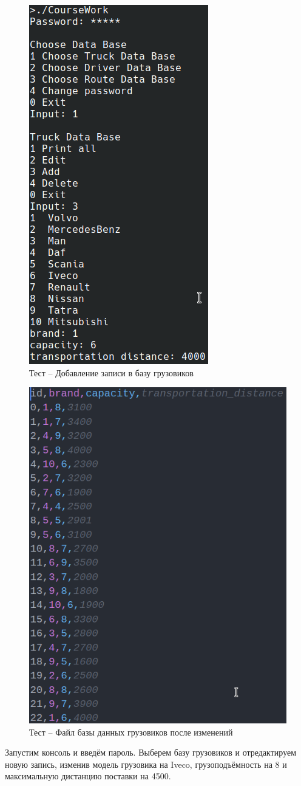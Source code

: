 \begin{figure}[H]
	\centering
	\includegraphics[width=0.4\linewidth]{photo/tests/admin/truck_db_add}
	\caption{Тест -- Добавление записи в базу грузовиков}
	\label{truck_db_add}
\end{figure}

\begin{figure}[H]
	\centering
	\includegraphics[width=0.5\linewidth]{photo/tests/admin/truck_db_state_add}
	\caption{Тест -- Файл базы данных грузовиков после изменений}
	\label{truck_db_state_add}
\end{figure}

Запустим консоль и введём пароль. 
Выберем базу грузовиков и отредактируем новую запись,
изменив модель грузовика на Iveco, 
грузоподъёмность на 8 и 
максимальную дистанцию поставки на 4500.

